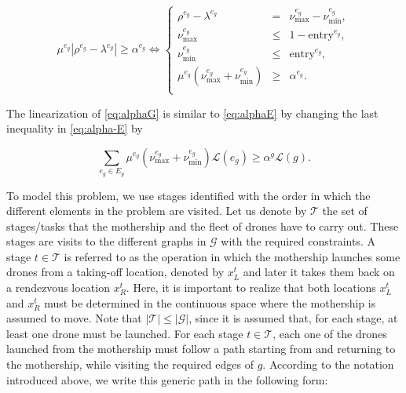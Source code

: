 \begin{equation}\label{eq:alpha-E}\tag{$\alpha$-E}
 \mu^{e_g}|\rho^{e_g}-\lambda^{e_g}|\geq \alpha^{e_g} \Longleftrightarrow
 \left\{
 \begin{array}{ccl}
  \rho^{e_g} - \lambda^{e_g}                       & =    & \nu_\text{max}^{e_g} - \nu_\text{min}^{e_g},                                     \\
  \nu_\text{max}^{e_g}                         & \leq & 1-{\text{entry}^{e_g}},                                   \\
  \nu_\text{min}^{e_g}                      & \leq & {  \text{entry}^{e_g}},                                        \\
  \mu^{e_g}(\nu_\text{max}^{e_g} + \nu_\text{min}^{e_g} ) & \geq & \alpha^{e_g}.
  \\
 \end{array}
 \right.
\end{equation}

\noindent
The linearization of \eqref{eq:alphaG} is similar to \eqref{eq:alphaE} by changing the last inequality in \eqref{eq:alpha-E} by

\begin{equation}\label{eq:alpha-G}\tag{$\alpha$-G}
\sum_{e_g\in E_g} \mu^{e_g}(\nu_\text{max}^{e_g} + \nu_\text{min}^{e_g})\mathcal L(e_g)\geq \alpha^g\mathcal L(g).
\end{equation}

\noindent
To model this problem, we use stages identified with the order in which the different elements in the problem are visited. Let us denote by $\mathcal T$ the set of stages/tasks that the mothership and the fleet of drones have to carry out. These stages are visits to the different graphs in $\mathcal G$ with the required constraints. A stage $t\in\mathcal T$ is referred to as the operation in which the mothership launches some drones from a taking-off location, denoted by $x_L^t$ and later it takes them back on a rendezvous location $x_R^t$. Here, it is important to realize that both locations $x_L^t$ and $x_R^t$ must be determined in the continuous space where the mothership is assumed to move. Note that $|\mathcal T|\leq|\mathcal G|$, since it is assumed that, for each stage, at least one drone must be launched.
\noindent
For each stage $t\in\mathcal T$, each one of the drones launched from the mothership must follow a path starting from and returning to the mothership, while visiting the required edges of $g$. According to the notation introduced above, we write this generic path in the following form:

